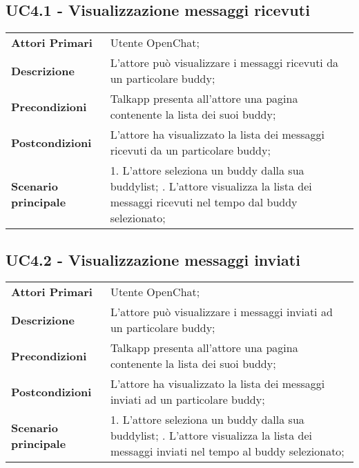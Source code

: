 \subsection{UC4.1 - Visualizzazione messaggi ricevuti}
	\begin{center}
	\bgroup
	\def\arraystretch{1.8}     
	\begin{longtable}{  p{4cm} | p{9.5cm} } 
		\textbf{Attori Primari} & Utente OpenChat; \\ 
		\textbf{Descrizione} &  L'attore può visualizzare i messaggi ricevuti da un particolare buddy; \\ 
		\textbf{Precondizioni}  & Talkapp presenta all'attore una pagina contenente la lista dei suoi buddy; \\
		\textbf{Postcondizioni} & L'attore ha visualizzato la lista dei messaggi ricevuti  da un particolare buddy;  \\ 
		\textbf{Scenario principale} & 
		1. L'attore seleziona un buddy dalla sua buddylist; \newline
		2. L'attore visualizza la lista dei messaggi ricevuti nel tempo dal buddy selezionato;
	\end{longtable}
	\egroup
\end{center}

\subsection{UC4.2 - Visualizzazione messaggi inviati}
	\begin{center}
	\bgroup
	\def\arraystretch{1.8}     
	\begin{longtable}{  p{4cm} | p{9.5cm} } 
		\textbf{Attori Primari} & Utente OpenChat; \\ 
		\textbf{Descrizione} &  L'attore può visualizzare i messaggi inviati ad un particolare buddy; \\ 
		\textbf{Precondizioni}  & Talkapp presenta all'attore una pagina contenente la lista dei suoi buddy; \\
		\textbf{Postcondizioni} & L'attore ha visualizzato la lista dei messaggi inviati  ad un particolare buddy;  \\ 
		\textbf{Scenario principale} & 
		1. L'attore seleziona un buddy dalla sua buddylist; \newline
		2. L'attore visualizza la lista dei messaggi inviati nel tempo al buddy selezionato;
	\end{longtable}
	\egroup
\end{center}

